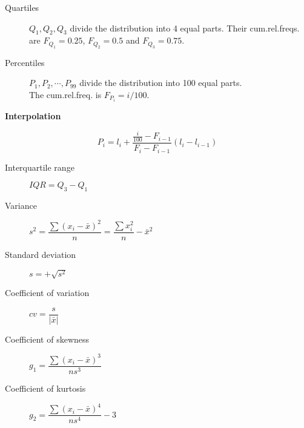 \begin{multicols*}{2}
\begin{tcolorbox}[hbox, title=Position statistics]
\begin{minipage}{0.4\textwidth}
\begin{description}
\item [Quartiles] $Q_1,Q_2,Q_3$ divide the distribution into 4 equal parts.
      Their cum.rel.freqs. are
      $F_{Q_1}=0.25$, $F_{Q_2}=0.5$ and $F_{Q_3}=0.75$.
\item [Percentiles] $P_1,P_2,\cdots,P_{99}$ divide the distribution into 100 equal parts.\\
      The cum.rel.freq. is $F_{P_i}=i/100$.
\end{description}

\textbf{Interpolation}

\resizebox{\textwidth}{!}{}

\[P_i=l_i+\frac{\frac{i}{100}-F_{i-1}}{F_i-F_{i-1}}(l_i-l_{i-1})\]

\end{minipage}
\end{tcolorbox}

\begin{tcolorbox}[hbox, title=Dispersion statistics]
\begin{minipage}{0.4\textwidth}
\begin{description}
\item [Interquartile range] $IQR=Q_3-Q_1$
\item [Variance] $s^2=\dfrac{\sum (x_i-\bar x)^2}{n}=\dfrac{\sum x_i^2}{n}-\bar x^2$
\item [Standard deviation] $s=+\sqrt{s^2}$
\item [Coefficient of variation] $cv=\dfrac{s}{|\bar{x}|}$
\end{description}
\end{minipage}
\end{tcolorbox}

\begin{tcolorbox}[hbox, title=Shape statistics]
\begin{minipage}{0.4\textwidth}
\begin{description}
\item [Coefficient of skewness] $g_1=\dfrac{\sum(x_i-\bar{x})^3}{ns^3}$
\item [Coefficient of kurtosis] $g_2=\dfrac{\sum(x_i-\bar{x})^4}{ns^4}-3$
\end{description}
\end{minipage}
\end{tcolorbox}


\end{multicols*}
